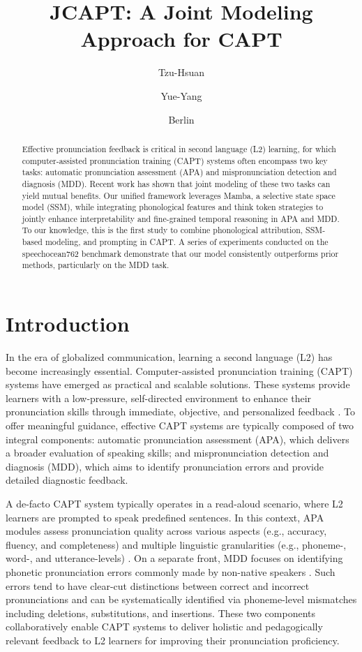 \documentclass{Interspeech}
\title{JCAPT: A Joint Modeling Approach for CAPT}
\author[affiliation={}]{Tzu-Hsuan}{Yang}
\author[affiliation={}]{Yue-Yang}{He}
\author[affiliation={}]{Berlin}{Chen}
\affiliation{}{National Taiwan Normal University}{Taipei, Taiwan}
\begin{document}
\maketitle

\begin{abstract}
Effective pronunciation feedback is critical in second language (L2) learning, for which computer-assisted pronunciation training (CAPT) systems often encompass two key tasks: automatic pronunciation assessment (APA) and mispronunciation detection and diagnosis (MDD). Recent work has shown that joint modeling of these two tasks can yield mutual benefits. Our unified framework leverages Mamba, a selective state space model (SSM), while integrating phonological features and think token strategies to jointly enhance interpretability and fine-grained temporal reasoning in APA and MDD. To our knowledge, this is the first study to combine phonological attribution, SSM-based modeling, and prompting in CAPT. A series of experiments conducted on the speechocean762 benchmark demonstrate that our model consistently outperforms prior methods, particularly on the MDD task.
\end{abstract}




\section{Introduction}

In the era of globalized communication, learning a second language (L2) has become increasingly essential. Computer-assisted pronunciation training (CAPT) systems have emerged as practical and scalable solutions. These systems provide learners with a low-pressure, self-directed environment to enhance their pronunciation skills through immediate, objective, and personalized feedback \cite{Munday17-Duo, Kholis21-Elsa}. To offer meaningful guidance, effective CAPT systems are typically composed of two integral components: automatic pronunciation assessment (APA), which delivers a broader evaluation of speaking skills; and mispronunciation detection and diagnosis (MDD), which aims to identify pronunciation errors and provide detailed diagnostic feedback.

A de-facto CAPT system typically operates in a read-aloud scenario, where L2 learners are prompted to speak predefined sentences. In this context, APA modules assess pronunciation quality across various aspects (e.g., accuracy, fluency, and completeness) and multiple linguistic granularities (e.g., phoneme-, word-, and utterance-levels) \cite{Gong22-MultiAspect, Yan23-OrdinalLoss, yan2024effective}. On a separate front, MDD focuses on identifying phonetic pronunciation errors commonly made by non-native speakers \cite{wang2022exploring, Ye22-APL, Yan23-Peppanet}. Such errors tend to have clear-cut distinctions between correct and incorrect pronunciations and can be systematically identified via phoneme-level mismatches including deletions, substitutions, and insertions. These two components collaboratively enable CAPT systems to deliver holistic and pedagogically relevant feedback to L2 learners for improving their pronunciation proficiency.
\end{document}

